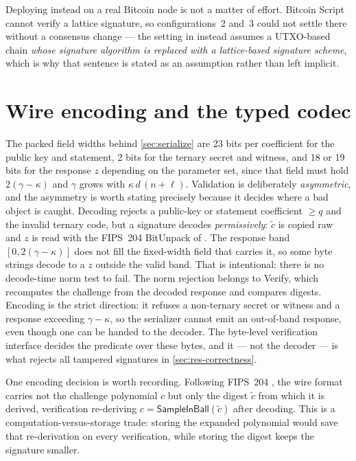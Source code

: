 Deploying instead on a real Bitcoin node is not a matter of effort. Bitcoin Script
cannot verify a lattice signature, so configurations~2 and~3 could not settle there
without a consensus change --- the setting in \cite{esgin2020post} instead assumes a
UTXO-based chain \emph{whose signature algorithm is replaced with a lattice-based
signature scheme}, which is why that sentence is stated as an assumption rather than
left implicit.

\section{Wire encoding and the typed codec}
\label{app:serialize}

The packed field widths behind \cref{sec:serialize} are 23 bits per coefficient for the
public key and statement, 2 bits for the ternary secret and witness, and 18 or 19 bits
for the response $z$ depending on the parameter set, since that field must hold
$2(\gamma-\kappa)$ and $\gamma$ grows with $\kappa\,d\,(n+\ell)$. Validation is
deliberately \emph{asymmetric}, and the asymmetry is worth stating precisely because it
decides where a bad object is caught. Decoding rejects a public-key or statement
coefficient $\ge q$ and the invalid ternary code, but a signature decodes
\emph{permissively}: $\tilde c$ is copied raw and $z$ is read with the FIPS~204
\textsf{BitUnpack} of \cite{1274601}. The response band $[0,2(\gamma-\kappa)]$ does not
fill the fixed-width field that carries it, so some byte strings decode to a $z$ outside
the valid band. That is intentional: there is no decode-time norm test to fail. The norm
rejection belongs to Verify, which recomputes the challenge from the decoded response and
compares digests. Encoding is the strict direction: it refuses a non-ternary secret or
witness and a response exceeding $\gamma-\kappa$, so the serializer cannot emit an
out-of-band response, even though one can be handed to the decoder.
The byte-level verification interface decides the predicate over these bytes, and it --- not the
decoder --- is what rejects all \tamperFlips{} tampered signatures in
\cref{sec:res-correctness}.

One encoding decision is worth recording. Following FIPS~204 \cite{1274601}, the wire
format carries not the challenge polynomial $c$ but only the digest $\tilde c$ from
which it is derived, verification re-deriving
$c = \textsf{SampleInBall}(\tilde c)$ after decoding. This is a
computation-versus-storage trade: storing the expanded polynomial would save that
re-derivation on every verification, while storing the digest keeps the signature smaller.

